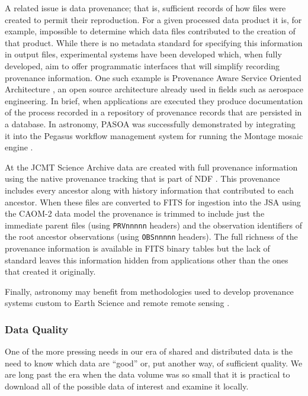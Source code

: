 \documentclass[final,authoryear,5p,times,twocolumn]{elsarticle}
\begin{document}
{{A related issue is data provenance; that is, sufficient records of how files
were created to permit their reproduction. For a given processed data product
it is, for example, impossible to determine which data files
contributed to the creation of that product. While there is no metadata standard
for specifying this
information in output files, experimental systems have been developed which, when fully developed,
aim to offer programmatic interfaces that will
simplify recording provenance information. One such example is
Provenance Aware Service Oriented Architecture
\citep[PASOA;][]{2008IPAWMoreau,2011743Moreau}, an open source architecture
already used in fields such as aerospace engineering. In brief, when
applications are executed they produce documentation of the process recorded
in a repository of provenance records that are persisted in a database. In
astronomy, PASOA was successfully demonstrated by integrating it into the
Pegasus workflow management system for running the Montage mosaic engine
\citep{2009SCGroth}.


At the JCMT Science Archive \citep[JSA;][]{2008ASPC..394..135G} data are
created with full provenance information using the native provenance
tracking that is part of NDF \citep{2009ASPC..411..418J}. This
provenance includes every ancestor along with history information that
contributed to each ancestor. When these files are converted to FITS
for ingestion into the JSA using the CAOM-2 data model
\citep{2013ASPC..475..159R} the provenance is trimmed to include
just the immediate parent files (using \texttt{PRVnnnnn} headers)
and the observation identifiers of the root ancestor observations
(using \texttt{OBSnnnnn} headers). The full richness of the provenance
information is available in FITS binary tables but the lack of standard
leaves this information hidden from applications other than the ones
that created it originally.

Finally, astronomy may benefit from methodologies used to develop provenance
systems custom to Earth Science and remote remote sensing
\citep{2008IPAWTilmes,2008IPAWMcCann}.


\subsubsection{Data Quality}


One of the more pressing needs in our era of shared and distributed
data is the need to know which data are ``good'' or, put another way, of
sufficient quality. We are long past the era when the data volume was
so small that it is practical to download all of the possible data of
interest and examine it locally.


}}
\end{document}
